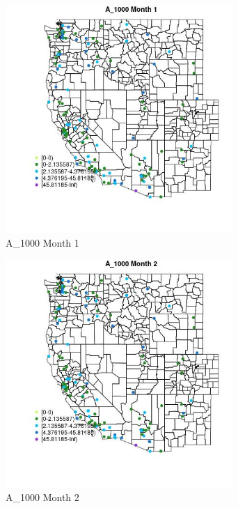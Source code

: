 \begin{figure} 
\centering  
\includegraphics[width=0.77\textwidth]{Code_Outputs/Report_ML_input_PM25_Step4_part_e_de_duplicated_aves_MapObsMo1A_1000.jpg} 
\caption{\label{fig:Report_ML_input_PM25_Step4_part_e_de_duplicated_avesMapObsMo1A_1000}A_1000 Month 1} 
\end{figure} 
 

\begin{figure} 
\centering  
\includegraphics[width=0.77\textwidth]{Code_Outputs/Report_ML_input_PM25_Step4_part_e_de_duplicated_aves_MapObsMo2A_1000.jpg} 
\caption{\label{fig:Report_ML_input_PM25_Step4_part_e_de_duplicated_avesMapObsMo2A_1000}A_1000 Month 2} 
\end{figure} 
 

